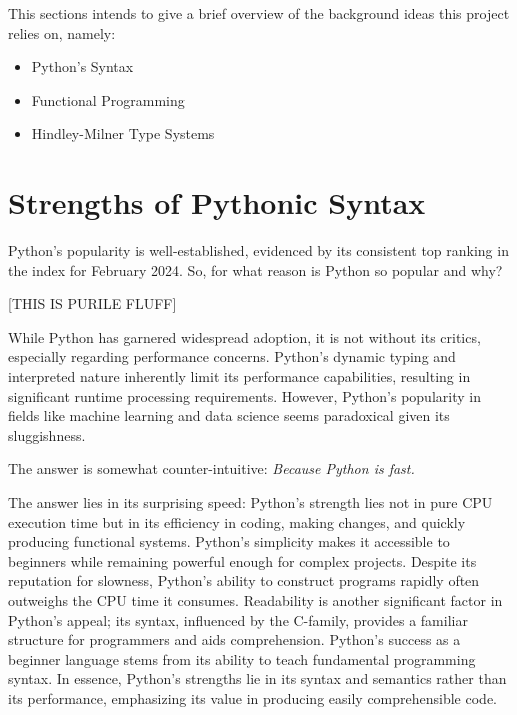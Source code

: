 \documentclass{l4proj}
\begin{document}
This sections intends to give a brief overview of the background ideas this project relies on, namely:
\begin{itemize}
    \item Python's Syntax
    \item Functional Programming
    \item Hindley-Milner Type Systems
\end{itemize}

\section{Strengths of Pythonic Syntax}




Python's popularity is well-established, evidenced by its consistent top ranking in the \cite{TIOBE} index for February 2024. So, for what reason is Python so popular and why?

[THIS IS PURILE FLUFF]

While Python has garnered widespread adoption, it is not without its critics, especially regarding performance concerns.
Python's dynamic typing and interpreted nature inherently limit its performance capabilities, resulting in significant runtime processing requirements.
However, Python's popularity in fields like machine learning and data science seems paradoxical given its sluggishness.

The answer is somewhat counter-intuitive: \emph{Because Python is fast.}


The answer lies in its surprising speed: Python's strength lies not in pure CPU execution time but in its efficiency in coding, making changes, and quickly producing functional systems.
Python's simplicity makes it accessible to beginners while remaining powerful enough for complex projects.
Despite its reputation for slowness, Python's ability to construct programs rapidly often outweighs the CPU time it consumes.
Readability is another significant factor in Python's appeal; its syntax, influenced by the C-family, provides a familiar structure for programmers and aids comprehension.
Python's success as a beginner language stems from its ability to teach fundamental programming syntax.
In essence, Python's strengths lie in its syntax and semantics rather than its performance, emphasizing its value in producing easily comprehensible code.
\end{document}
